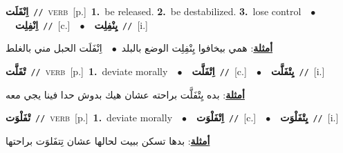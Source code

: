 \documentclass[10pt,a4paper,twoside]{article} %
\begin{document}
\begin{multicols}{2}
{\setlength\topsep{0pt}\textbf{\foreignlanguage{arabic}{اِنْفَلَت}}\ {\color{gray}\texttt{//}\color{black}}\ \textsc{verb}\ [p.]\ \textbf{1.}~be released.  \textbf{2.}~be destabilized.  \textbf{3.}~lose control\ \ $\bullet$\ \ \setlength\topsep{0pt}\textbf{\foreignlanguage{arabic}{اِنْفِلِت}}\ {\color{gray}\texttt{//}\color{black}}\ [c.]\ \ $\bullet$\ \ \setlength\topsep{0pt}\textbf{\foreignlanguage{arabic}{يِنْفِلِت}}\ {\color{gray}\texttt{//}\color{black}}\ [i.]\  \begin{flushright}\color{gray}\foreignlanguage{arabic}{\textbf{\underline{\foreignlanguage{arabic}{أمثلة}}}: همي بيخافوا يِنْفِلِت الوضع بالبلد\ $\bullet$\ \  اِنْفَلَت الحبل مني بالغلط}\end{flushright}\color{black}} \vspace{2mm}

{\setlength\topsep{0pt}\textbf{\foreignlanguage{arabic}{تْفَلَّت}}\ {\color{gray}\texttt{//}\color{black}}\ \textsc{verb}\ [p.]\ \textbf{1.}~deviate morally\ \ $\bullet$\ \ \setlength\topsep{0pt}\textbf{\foreignlanguage{arabic}{اِتْفَلَّت}}\ {\color{gray}\texttt{//}\color{black}}\ [c.]\ \ $\bullet$\ \ \setlength\topsep{0pt}\textbf{\foreignlanguage{arabic}{يِتْفَلَّت}}\ {\color{gray}\texttt{//}\color{black}}\ [i.]\  \begin{flushright}\color{gray}\foreignlanguage{arabic}{\textbf{\underline{\foreignlanguage{arabic}{أمثلة}}}: بده يِتْفَلَّت براحته عشان هيك بدوش حدا فينا يجي معه}\end{flushright}\color{black}} \vspace{2mm}

{\setlength\topsep{0pt}\textbf{\foreignlanguage{arabic}{تْفَلْوَت}}\ {\color{gray}\texttt{//}\color{black}}\ \textsc{verb}\ [p.]\ \textbf{1.}~deviate morally\ \ $\bullet$\ \ \setlength\topsep{0pt}\textbf{\foreignlanguage{arabic}{اِتْفَلْوَت}}\ {\color{gray}\texttt{//}\color{black}}\ [c.]\ \ $\bullet$\ \ \setlength\topsep{0pt}\textbf{\foreignlanguage{arabic}{يِتْفَلْوَت}}\ {\color{gray}\texttt{//}\color{black}}\ [i.]\  \begin{flushright}\color{gray}\foreignlanguage{arabic}{\textbf{\underline{\foreignlanguage{arabic}{أمثلة}}}: بدها تسكن ببيت لحالها عشان تِتفَلوَت براحتها}\end{flushright}\color{black}} \vspace{2mm}


\end{multicols}
\end{document}
